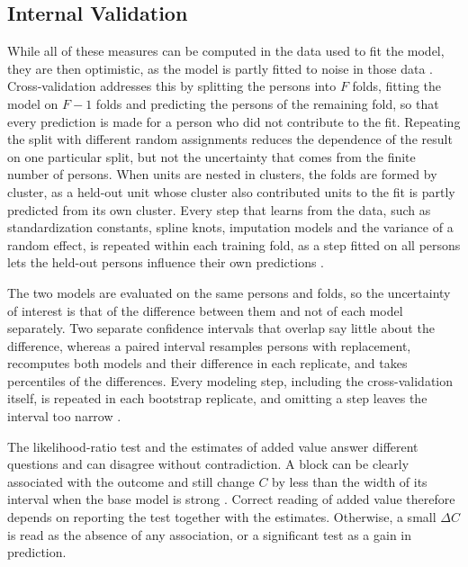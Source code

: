 \subsection{Internal Validation}
\label{sec:tech-internal-validation}

While all of these measures can be computed in the data used to fit the model, they are then optimistic, as the model is partly fitted to noise in those data \cite{steyerberg2019cpm}.
Cross-validation addresses this by splitting the persons into $F$ folds, fitting the model on $F - 1$ folds and predicting the persons of the remaining fold, so that every prediction is made for a person who did not contribute to the fit.
Repeating the split with different random assignments reduces the dependence of the result on one particular split, but not the uncertainty that comes from the finite number of persons.
When units are nested in clusters, the folds are formed by cluster, as a held-out unit whose cluster also contributed units to the fit is partly predicted from its own cluster.
Every step that learns from the data, such as standardization constants, spline knots, imputation models and the variance of a random effect, is repeated within each training fold, as a step fitted on all persons lets the held-out persons influence their own predictions \cite{collins2024evaluation}.

The two models are evaluated on the same persons and folds, so the uncertainty of interest is that of the difference between them and not of each model separately.
Two separate confidence intervals that overlap say little about the difference, whereas a paired interval resamples persons with replacement, recomputes both models and their difference in each replicate, and takes percentiles of the differences.
Every modeling step, including the cross-validation itself, is repeated in each bootstrap replicate, and omitting a step leaves the interval too narrow \cite{collins2024evaluation}.

The likelihood-ratio test and the estimates of added value answer different questions and can disagree without contradiction.
A block can be clearly associated with the outcome and still change $C$ by less than the width of its interval when the base model is strong \cite{pencina2008nri, vickers2011onetest}.
Correct reading of added value therefore depends on reporting the test together with the estimates.
Otherwise, a small $\Delta C$ is read as the absence of any association, or a significant test as a gain in prediction.
